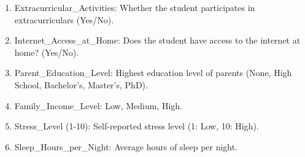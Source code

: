 \begin{enumerate}
\begin{enumerate}
		\item Extracurricular\_Activities: Whether the student participates in extracurriculars (Yes/No).
		\item Internet\_Access\_at\_Home: Does the student have access to the internet at home? (Yes/No).
		\item Parent\_Education\_Level: Highest education level of parents (None, High School, Bachelor's, Master's, PhD).
		\item Family\_Income\_Level: Low, Medium, High.
		\item Stress\_Level (1-10): Self-reported stress level (1: Low, 10: High).
		\item Sleep\_Hours\_per\_Night: Average hours of sleep per night.
		
	\end{enumerate} 	
\end{enumerate}




